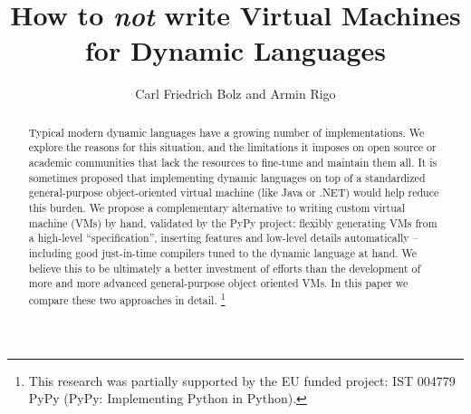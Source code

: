 \documentclass{llncs}
\begin{document}
\pagestyle{headings}

\title{How to \emph{not} write Virtual Machines for Dynamic Languages}


\author{Carl Friedrich Bolz and Armin Rigo}




\maketitle

\begin{abstract}

Typical modern dynamic languages have a growing number of
implementations.  We explore the reasons for this situation, and the
limitations it imposes on open source or academic communities that lack
the resources to fine-tune and maintain them all.  It is sometimes
proposed that implementing dynamic languages on top of a standardized
general-purpose object-oriented virtual machine (like Java or .NET)
would help reduce this burden.  We propose a complementary alternative
to writing custom virtual machine (VMs) by hand, validated by the PyPy
project: flexibly generating VMs from a high-level ``specification'',
inserting features and low-level details automatically -- including good
just-in-time compilers tuned to the dynamic language at hand.  We
believe this to be ultimately a better investment of efforts than the
development of more and more advanced general-purpose object oriented
VMs.  In this paper we compare these two approaches in detail.
\footnote{This research was partially supported by the EU funded
 project: IST 004779 PyPy (PyPy: Implementing Python in Python).} \\

\end{abstract}
\end{document}

